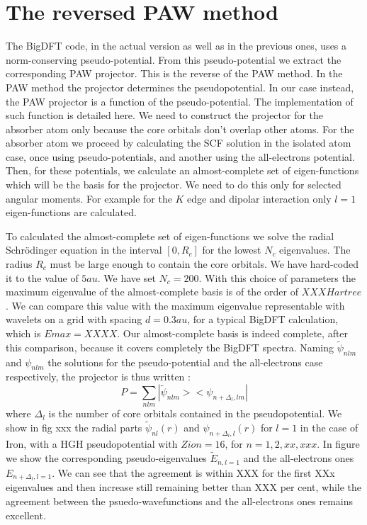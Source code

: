 \documentclass[a4paper,11pt]{report}
\begin{document}


\section{The reversed PAW method}

The BigDFT code, in the actual version as well as in the previous
ones, uses a norm-conserving pseudo-potential.
From this pseudo-potential we extract the corresponding
PAW projector.
This is the reverse of the PAW method. In the PAW method 
the projector determines the pseudopotential. In our case
instead, the PAW projector is a function of the pseudo-potential.
The implementation of such function is detailed here.
We need to construct the projector for the absorber atom only
because the core orbitals don't overlap other atoms.
For the absorber atom we proceed by calculating 
the SCF solution in the isolated atom case, once using pseudo-potentials,
and another using the all-electrons potential.
Then, for these potentials, we calculate an almost-complete set 
of eigen-functions which will be the basis for the projector.
We need to do this only for selected angular moments.
For example for the $K$ edge and dipolar interaction
only $l=1$ eigen-functions are calculated.

To calculated the almost-complete set of eigen-functions
we solve the radial Schr\"odinger equation in the interval $[0,R_c]$
for the lowest $N_c$ eigenvalues. The radius $R_c$ must be large
enough to contain the core orbitals. We have hard-coded it to the
value of $5au$. We have set $N_c=200$. With this choice of parameters
the maximum eigenvalue of the almost-complete basis is of the order
of $XXX Hartree$. We can compare this value with the maximum
eigenvalue representable with wavelets on a grid with spacing
$d=0.3au$, for a typical BigDFT calculation,  which is $Emax = XXXX$.
Our almost-complete basis is indeed
complete, after this comparison, because 
it covers completely the BigDFT spectra. 
Naming   $\tilde \psi_{nlm}$ and $\psi_{nlm}$ 
the solutions for the pseudo-potential and the all-electrons case
respectively, 
the projector is thus written :
$$   P= \sum_{nlm} |\tilde \psi_{nlm}><\psi_{n+\Delta_l,lm}| $$
where $\Delta_l$ is the number of core orbitals contained in the
pseudopotential.
We show in fig xxx the radial parts 
 $\tilde \psi_{nl}(r)$ and $\psi_{n+\Delta_l,l}(r)$  for $l=1$
 in the case of Iron, with a HGH pseudopotential  %
with $Zion=16$, for $n=1,2,xx,xxx$.
In figure we show the corresponding pseudo-eigenvalues $\tilde E_{n,l=1}$ and
the all-electrons ones $ E_{n+\Delta_l,l=1}$.
We can see that the agreement is within XXX for the first XXx
eigenvalues and then increase still remaining better than XXX per cent,
while the agreement between the psuedo-wavefunctions and the
all-electrons ones remains excellent. 
\end{document}

